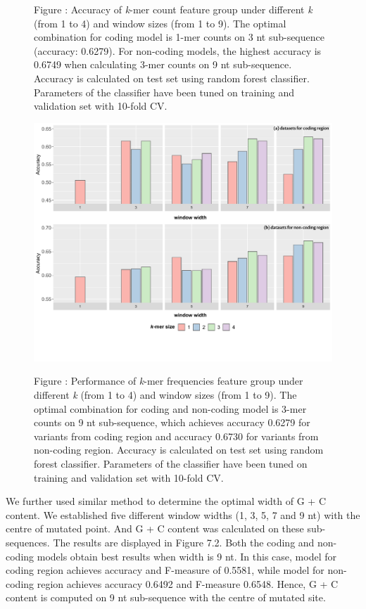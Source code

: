 \documentclass[a4paper,nohyper,nobib,openany,justified]{tufte-book}
\begin{document}
\begin{fullwidth}
\begin{figure}[t]
  \smallskip\noindent\small Figure \thefigure:
Accuracy of \emph{k}-mer count feature group under different \emph{k} (from 1 to 4) and window sizes (from 1 to 9). The optimal combination for coding model is 1-mer counts on 3 nt sub-sequence (accuracy: 0.6279). For non-coding models, the highest accuracy is 0.6749 when calculating 3-mer counts on 9 nt sub-sequence. Accuracy is calculated on test set using random forest classifier. Parameters of the classifier have been tuned on training and validation set with 10-fold CV.  %
  \label{fig:kmer_count}%
\end{figure}

\begin{figure}[t]
  \includegraphics[width=\linewidth]{perf_spectrum_freq.pdf}%

  \smallskip\noindent\small Figure \thefigure:
Performance of \emph{k}-mer frequencies feature group under different \emph{k} (from 1 to 4) and window sizes (from 1 to 9). The optimal combination for coding and non-coding model is 3-mer counts on 9 nt sub-sequence, which achieves accuracy 0.6279 for variants from coding region and accuracy 0.6730 for variants from non-coding region. Accuracy is calculated on test set using random forest classifier. Parameters of the classifier have been tuned on training and validation set with 10-fold CV.  %
  \label{fig:kmer_freq}%
\end{figure}

We further used similar method to determine the optimal width of G + C content. We established five different window widths (1, 3, 5, 7 and 9 nt) with the centre of mutated point. And G + C content was calculated on these sub-sequences. The results are displayed in Figure 7.2. Both the coding and non-coding models obtain best results when width is 9 nt. In this case, model for coding region achieves accuracy and F-measure of 0.5581, while model for non-coding region achieves accuracy 0.6492 and F-measure 0.6548. Hence, G + C content is computed on 9 nt sub-sequence with the centre of mutated site.


\end{fullwidth}
\end{document}
